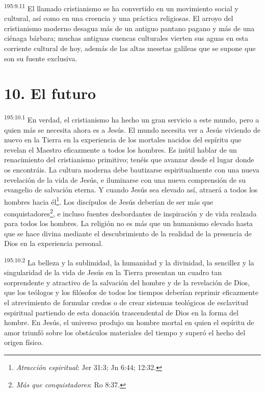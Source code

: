 \par 
\textsuperscript{195:9.11} El llamado cristianismo se ha convertido en un movimiento social y cultural, así como en una creencia y una práctica religiosas. El arroyo del cristianismo moderno desagua más de un antiguo pantano pagano y más de una ciénaga bárbara; muchas antiguas cuencas culturales vierten sus aguas en esta corriente cultural de hoy, además de las altas mesetas galileas que se supone que son su fuente exclusiva.

\section*{10. El futuro}
\par 
\textsuperscript{195:10.1} En verdad, el cristianismo ha hecho un gran servicio a este mundo, pero a quien más se necesita ahora es a Jesús. El mundo necesita ver a Jesús viviendo de nuevo en la Tierra en la experiencia de los mortales nacidos del espíritu que revelan el Maestro eficazmente a todos los hombres. Es inútil hablar de un renacimiento del cristianismo primitivo; tenéis que avanzar desde el lugar donde os encontráis. La cultura moderna debe bautizarse espiritualmente con una nueva revelación de la vida de Jesús, e iluminarse con una nueva comprensión de su evangelio de salvación eterna. Y cuando Jesús sea elevado así, atraerá a todos los hombres hacia él\footnote{\textit{Atracción espiritual}: Jer 31:3; Jn 6:44; 12:32.}. Los discípulos de Jesús deberían de ser más que conquistadores\footnote{\textit{Más que conquistadores}: Ro 8:37.}, e incluso fuentes desbordantes de inspiración y de vida realzada para todos los hombres. La religión no es más que un humanismo elevado hasta que se hace divina mediante el descubrimiento de la realidad de la presencia de Dios en la experiencia personal.

\par 
\textsuperscript{195:10.2} La belleza y la sublimidad, la humanidad y la divinidad, la sencillez y la singularidad de la vida de Jesús en la Tierra presentan un cuadro tan sorprendente y atractivo de la salvación del hombre y de la revelación de Dios, que los teólogos y los filósofos de todos los tiempos deberían reprimir eficazmente el atrevimiento de formular credos o de crear sistemas teológicos de esclavitud espiritual partiendo de esta donación trascendental de Dios en la forma del hombre. En Jesús, el universo produjo un hombre mortal en quien el espíritu de amor triunfó sobre los obstáculos materiales del tiempo y superó el hecho del origen físico.

